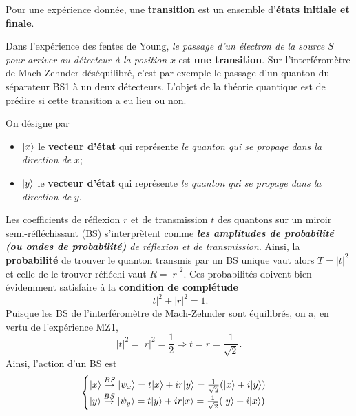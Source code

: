 \colorbox[gray]{0.8}{
\parbox[c]{0.9\textwidth}{
\begin{definition}
Pour une expérience donnée, une \textbf{transition} est un ensemble
d'\textbf{états initiale et finale}.
\end{definition}
}}
\medskip

Dans l'expérience des fentes de Young, \emph{le passage d'un électron de la
source} $S$ \emph{pour arriver au détecteur à la position }$x$ est \textbf{une
transition}. Sur l'interféromètre de Mach-Zehnder déséquilibré, c'est par
exemple le passage d'un quanton du séparateur BS1 à un deux détecteurs.
L'objet de la théorie quantique est de prédire si cette transition a eu lieu
ou non.

On désigne par

\begin{itemize}
\item $\vert x\rangle$ le \textbf{vecteur d'état} qui représente \emph{le quanton qui
se propage dans la direction de }$x$;

\item $\vert y\rangle$ le \textbf{vecteur d'état} qui représente \emph{le quanton qui
se propage dans la direction de }$y$.
\end{itemize}

Les coefficients de réflexion $r$ et de transmission $t$ des quantons sur un
miroir semi-réfléchissant (BS) s'interprètent comme \emph{\textbf{les amplitudes
de probabilité (ou ondes de probabilité)} de réflexion et de transmission}.
Ainsi, la \textbf{probabilité} de trouver le quanton transmis par un BS unique
vaut alors $T=|t|^{2}$ et celle de le trouver réfléchi vaut $R=|r|^{2}$. Ces
probabilités doivent bien évidemment satisfaire à la \textbf{condition de
complétude}%
\begin{equation}
|t|^{2}+|r|^{2}=1.
\end{equation}
Puisque les BS de l'interféromètre de Mach-Zehnder sont équilibrés, on a, en
vertu de l'expérience MZ1,%
\begin{equation}
|t|^{2}=|r|^{2}=\frac{1}{2}\Rightarrow t=r=\frac{1}{\sqrt{2}}.
\end{equation}
Ainsi, l'action d'un BS est
\begin{equation}
\begin{cases}
\vert x\rangle \overset{BS}{\rightarrow}\vert\psi_{x}\rangle =t\vert x\rangle+ir\vert y\rangle
=\frac{1}{\sqrt{2}}(\vert x\rangle +i\vert y\rangle) \\
\vert y\rangle \overset{BS}{\rightarrow}\vert\psi_{y}\rangle =t\vert y\rangle+ir\vert x\rangle
=\frac{1}{\sqrt{2}}(\vert y\rangle +i\vert x\rangle)
\end{cases}
\label{eq:ActionBS}
\end{equation}


